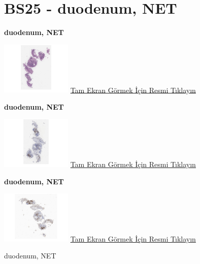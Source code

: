 \documentclass[
  letterpaper,
  DIV=11,
  numbers=noendperiod]{scrreprt}
\begin{document}
\hypertarget{sec-BS25}{%
\section{BS25 - duodenum, NET}\label{sec-BS25}}

\textbf{duodenum, NET}

\href{https://images.patolojiatlasi.com/BS25/HE.html}{\includegraphics[width=0.25\textwidth,height=\textheight]{./screenshots/thumbnail_BS25-HE.png}}
\href{https://images.patolojiatlasi.com/BS25/HE.html}{Tam Ekran Görmek
İçin Resmi Tıklayın}

\textbf{duodenum, NET}

\href{https://images.patolojiatlasi.com/BS25/CHR.html}{\includegraphics[width=0.25\textwidth,height=\textheight]{./screenshots/thumbnail_BS25-CHR.png}}
\href{https://images.patolojiatlasi.com/BS25/CHR.html}{Tam Ekran Görmek
İçin Resmi Tıklayın}

\textbf{duodenum, NET}

\href{https://images.patolojiatlasi.com/BS25/SYN.html}{\includegraphics[width=0.25\textwidth,height=\textheight]{./screenshots/thumbnail_BS25-SYN.png}}
\href{https://images.patolojiatlasi.com/BS25/SYN.html}{Tam Ekran Görmek
İçin Resmi Tıklayın}

\begin{tcolorbox}[enhanced jigsaw, breakable, opacitybacktitle=0.6, arc=.35mm, colbacktitle=quarto-callout-tip-color!10!white, colback=white, toptitle=1mm, left=2mm, opacityback=0, colframe=quarto-callout-tip-color-frame, titlerule=0mm, rightrule=.15mm, bottomrule=.15mm, toprule=.15mm, bottomtitle=1mm, title=\textcolor{quarto-callout-tip-color}{\faLightbulb}\hspace{0.5em}{Tanı}, coltitle=black, leftrule=.75mm]

duodenum, NET

\end{tcolorbox}
\end{document}
